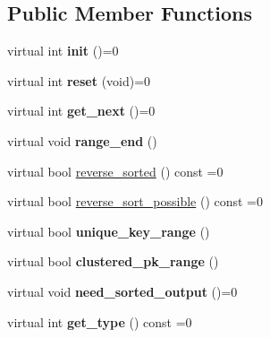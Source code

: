 \subsection*{Public Member Functions}
\begin{DoxyCompactItemize}
\item 
\mbox{\label{classQUICK__SELECT__I_aaab3a5f9e2eaf5f8736e0c86e44566d4}} 
virtual int {\bfseries init} ()=0
\item 
\mbox{\label{classQUICK__SELECT__I_afdc20b8381cf1473985e1710d290d50a}} 
virtual int {\bfseries reset} (void)=0
\item 
\mbox{\label{classQUICK__SELECT__I_a2a6f73877b5d9ed951efdafb39a0d68e}} 
virtual int {\bfseries get\+\_\+next} ()=0
\item 
\mbox{\label{classQUICK__SELECT__I_a9d458f9b211f3a3a89223382764308cf}} 
virtual void {\bfseries range\+\_\+end} ()
\item 
virtual bool \mbox{\hyperlink{classQUICK__SELECT__I_a686e8770fe10ac41bafdcf6d0c74dff3}{reverse\+\_\+sorted}} () const =0
\item 
virtual bool \mbox{\hyperlink{classQUICK__SELECT__I_a485c91ca6490bcf1de2eed5a7181a800}{reverse\+\_\+sort\+\_\+possible}} () const =0
\item 
\mbox{\label{classQUICK__SELECT__I_a8756f3bd6d27e7a02f14708ed4213619}} 
virtual bool {\bfseries unique\+\_\+key\+\_\+range} ()
\item 
\mbox{\label{classQUICK__SELECT__I_a27dac7ffaf17a6b707b863cda8f97285}} 
virtual bool {\bfseries clustered\+\_\+pk\+\_\+range} ()
\item 
\mbox{\label{classQUICK__SELECT__I_a147db928f1c191fbd54f7dbedf1d121c}} 
virtual void {\bfseries need\+\_\+sorted\+\_\+output} ()=0
\item 
\mbox{\label{classQUICK__SELECT__I_abcd89b71bba6d4d9659aef5c912511c6}} 
virtual int {\bfseries get\+\_\+type} () const =0
\item 
\mbox{\label{classQUICK__SELECT__I_aaa22143751c0eeef0ab0097d0bc798d5}} 

\end{DoxyCompactItemize}
